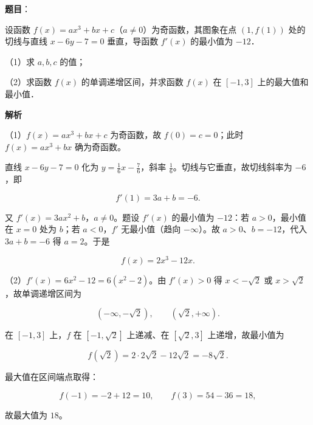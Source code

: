 \begin{answer}

\textbf{题目}：

设函数 $f(x)=ax^3+bx+c$（$a\neq0$）为奇函数，其图象在点 $(1,f(1))$ 处的切线与直线 $x-6y-7=0$ 垂直，导函数 $f'(x)$ 的最小值为 $-12$．

（1）求 $a,b,c$ 的值；

（2）求函数 $f(x)$ 的单调递增区间，并求函数 $f(x)$ 在 $[-1,3]$ 上的最大值和最小值．

\textbf{解析}

（1）$f(x)=ax^3+bx+c$ 为奇函数，故 $f(0)=c=0$；此时 $f(x)=ax^3+bx$ 确为奇函数。

直线 $x-6y-7=0$ 化为 $y=\frac16x-\frac76$，斜率 $\frac16$。切线与它垂直，故切线斜率为 $-6$，即

\nopagebreak[4]
\[f'(1)=3a+b=-6 .\]

又 $f'(x)=3ax^2+b$，$a\neq0$。题设 $f'(x)$ 的最小值为 $-12$：若 $a>0$，最小值在 $x=0$ 处为 $b$；若 $a<0$，$f'$ 无最小值（趋向 $-\infty$）。故 $a>0$、$b=-12$，代入 $3a+b=-6$ 得 $a=2$。于是

\nopagebreak[4]
\[f(x)=2x^3-12x .\]

（2）$f'(x)=6x^2-12=6(x^2-2)$。由 $f'(x)>0$ 得 $x<-\sqrt2$ 或 $x>\sqrt2$，故单调递增区间为

\nopagebreak[4]
\[(-\infty,-\sqrt2),\qquad (\sqrt2,+\infty).\]

在 $[-1,3]$ 上，$f$ 在 $[-1,\sqrt2]$ 上递减、在 $[\sqrt2,3]$ 上递增，故最小值为

\nopagebreak[4]
\[f(\sqrt2)=2\cdot2\sqrt2-12\sqrt2=-8\sqrt2 .\]

最大值在区间端点取得：

\nopagebreak[4]
\[f(-1)=-2+12=10,\qquad f(3)=54-36=18,\]

故最大值为 $18$。


\end{answer}
